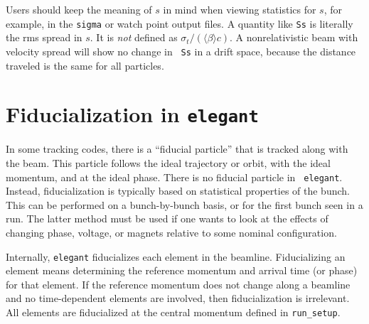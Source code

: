 \documentclass[11pt]{article}
\begin{document}
Users should keep the meaning of $s$ in mind when viewing statistics
for $s$, for example, in the {\tt sigma} or watch point output files.
A quantity like {\tt Ss} is literally the rms spread in $s$.  It is
{\em not} defined as $\sigma_t/(\langle \beta \rangle c)$.  A
nonrelativistic beam with velocity spread will show no change in {\tt
Ss} in a drift space, because the distance traveled is the same for
all particles.

\section{Fiducialization in {\tt elegant}}

In some tracking codes, there is a ``fiducial particle'' that is
tracked along with the beam.  This particle follows the ideal trajectory or orbit, with the ideal
momentum, and at the ideal phase.  There is no fiducial particle in {\tt
elegant}.  Instead, fiducialization is typically based on statistical properties of 
the bunch.  This can be performed on a bunch-by-bunch basis, or for the first
bunch seen in a run.  The latter method must be used if one wants to look at the
effects of changing phase, voltage, or magnets relative to some nominal configuration.

Internally, {\tt elegant} fiducializes each element in the beamline.
Fiducializing an element means determining the reference momentum and arrival time
(or phase) for that element.   If the reference momentum does not change along a beamline and no time-dependent elements
are involved, then fiducialization is irrelevant.  All elements are
fiducialized at the central momentum defined in \verb|run_setup|.
\end{document}
